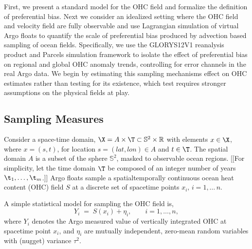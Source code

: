 
First, we present a standard model for the OHC field and formalize the definition of preferential bias.
Next we consider an idealized setting where the OHC field and velocity field are fully observable and use Lagrangian simulation of virtual Argo floats to quantify the scale of preferential bias produced by advection based sampling of ocean fields.
Specifically, we use the GLORYS12V1 reanalysis product and Parcels simulation framework to isolate the effect of preferential bias on regional and global OHC anomaly trends, controlling for error channels in the real Argo data.
We begin by estimating this sampling mechanisms effect on OHC estimates rather than testing for its existence, which test requires stronger assumptions on the physical fields at play.

\subsection{Sampling Measures}
\label{sec:measures}

Consider a space-time domain, $\X = A \times \T \subset \mathbb{S}^2 \times \mathbb{R}$ with elements $x \in \X$, where $x = (s,t)$, for location 
$s = (lat, lon) \in A$ and $t \in \T$. The spatial domain $A$ is a subset of the sphere $\mathbb{S}^2$, masked to observable ocean regions.
[[For simplicity, let the time domain $\T$ be composed of an integer number of years $\t_1, \ldots, \t_m$.]] Argo floats sample a spatialtemporally continuous ocean heat content (OHC) field $S$ at a discrete set of spacetime points $x_i,\,i = 1,\ldots\,n$.


A simple statistical model for sampling the OHC field is,
\begin{equation}
  Y_i \;=\; S(x_i) + \eta_i, \qquad i=1,\ldots,n, 
\end{equation}
where $Y_i$ denotes the Argo measured value of vertically integrated OHC at spacetime point $x_i$, and $\eta_i$ are mutually independent, zero-mean random variables with (nugget) variance $\tau^2$.

